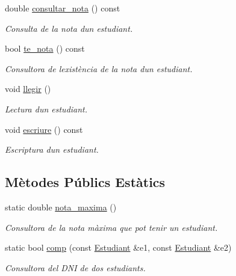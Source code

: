 \begin{DoxyCompactItemize}
double \hyperlink{class_estudiant_a21afbb59cddf87258d600df04ab95397}{consultar\+\_\+nota} () const
\begin{DoxyCompactList}\small\item\em Consulta de la nota d\textquotesingle{}un estudiant. \end{DoxyCompactList}\item 
bool \hyperlink{class_estudiant_a81f265e635e1fe198867a5b594359e1b}{te\+\_\+nota} () const
\begin{DoxyCompactList}\small\item\em Consultora de l\textquotesingle{}existència de la nota d\textquotesingle{}un estudiant. \end{DoxyCompactList}\item 
void \hyperlink{class_estudiant_af5c4883975828647dfb5ffc6735740e6}{llegir} ()
\begin{DoxyCompactList}\small\item\em Lectura d\textquotesingle{}un estudiant. \end{DoxyCompactList}\item 
void \hyperlink{class_estudiant_aa9a1736c5b133c65d0e9ba299bb41de5}{escriure} () const
\begin{DoxyCompactList}\small\item\em Escriptura d\textquotesingle{}un estudiant. \end{DoxyCompactList}\end{DoxyCompactItemize}
\subsection*{Mètodes Públics Estàtics}
\begin{DoxyCompactItemize}
\item 
static double \hyperlink{class_estudiant_a5df5eed414c87a2a1c2efa4194633afd}{nota\+\_\+maxima} ()
\begin{DoxyCompactList}\small\item\em Consultora de la nota màxima que pot tenir un estudiant. \end{DoxyCompactList}\item 
static bool \hyperlink{class_estudiant_a5f19b7f7436e8c12a13159335040ae42}{comp} (const \hyperlink{class_estudiant}{Estudiant} \&e1, const \hyperlink{class_estudiant}{Estudiant} \&e2)
\begin{DoxyCompactList}\small\item\em Consultora del D\+NI de dos estudiants. \end{DoxyCompactList}\end{DoxyCompactItemize}



